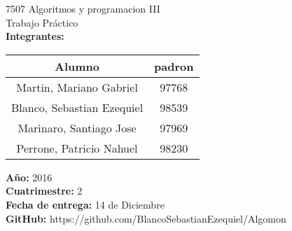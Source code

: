 \begin{titlepage}
    \vspace*{\fill}
    \begin{center}
        \Large 7507 Algoritmos y programacion III \\
        \Huge Trabajo Práctico\\
        \bigskip\bigskip\bigskip
        \large\textbf{Integrantes:} \\
        \begin{center}
            \begin{tabular}{||c | c||}
                \hline
                Alumno & padron \\ [0.5ex]
                \hline\hline
                Martin, Mariano Gabriel & 97768 \\
                \hline
                Blanco, Sebastian Ezequiel & 98539 \\
                \hline
                Marinaro, Santiago Jose & 97969 \\
                \hline
                Perrone, Patricio Nahuel & 98230 \\
                \hline
            \end{tabular}
        \end{center}
        \textbf{Año:} 2016 \\
        \textbf{Cuatrimestre:} 2 \\
        \textbf{Fecha de entrega:} 14 de Diciembre \\
        \textbf{GitHub:} https://github.com/BlancoSebastianEzequiel/Algomon \\
    \end{center}
    \vspace*{\fill}
\end{titlepage}
